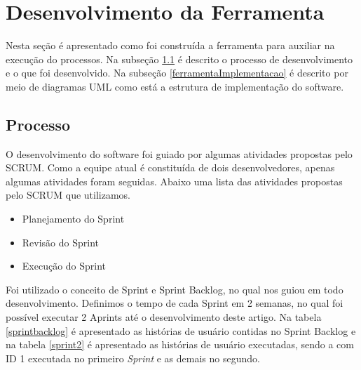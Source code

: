 \section{Desenvolvimento da Ferramenta}\label{ferramentaDeModelagemColabvorativa}
Nesta seção é apresentado como foi construída a ferramenta para auxiliar na execução do processos. Na subseção \ref{ferramentaProcesso} é descrito o processo de desenvolvimento e o que foi desenvolvido. Na subseção \ref{ferramentaImplementacao} é descrito por meio de diagramas UML como está a estrutura de implementação do software.
\subsection{Processo}\label{ferramentaProcesso}
O desenvolvimento do software foi guiado por algumas atividades propostas pelo SCRUM. Como a equipe atual é constituída de dois desenvolvedores, apenas algumas atividades foram seguidas. Abaixo uma lista das atividades propostas pelo SCRUM que utilizamos.
\begin{itemize}
	\item Planejamento do Sprint
	\item Revisão do Sprint
	\item Execução do Sprint
\end{itemize}
Foi utilizado o conceito de Sprint e Sprint Backlog, no qual nos guiou em todo desenvolvimento. Definimos o tempo de cada Sprint em 2 semanas, no qual foi possível executar 2 Aprints até o desenvolvimento deste artigo. Na tabela \ref{sprintbacklog} é apresentado as histórias de usuário contidas no Sprint Backlog e na tabela \ref{sprint2} é apresentado as histórias de usuário executadas, sendo a com ID 1 executada no primeiro \textit{Sprint} e as demais no segundo.
